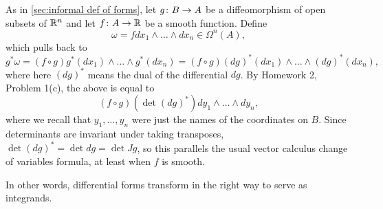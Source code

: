 As in \cref{sec:informal def of forms}, let $g \colon\thinspace\! B \to A$ be a diffeomorphism of open subsets of $\mathbb{R}^n$ and let $f \colon\thinspace\! A \to \mathbb{R}$ be a smooth function. Define
\[
	\omega = f dx_1 \wedge \dots \wedge dx_n \in \Omega^n(A),
\]
which pulls back to
\[
	g^\ast \omega = (f \circ g) g^\ast (dx_1) \wedge \dots \wedge g^\ast(dx_n) = (f \circ g) (dg)^\ast (dx_1) \wedge \dots \wedge (dg)^\ast (dx_n),
\]
where here $(dg)^\ast$ means the dual of the differential $dg$. By Homework 2, Problem 1(c), the above is equal to 
\[
	(f \circ g) (\det (dg)^\ast) dy_1 \wedge \dots \wedge dy_n,
\]
where we recall that $y_1, \dots , y_n$ were just the names of the coordinates on $B$. Since determinants are invariant under taking transposes, $\det(dg)^\ast = \det dg = \det Jg$, so this parallels the usual vector calculus change of variables formula, at least when $f$ is smooth.

In other words, differential forms transform in the right way to serve as integrands.

